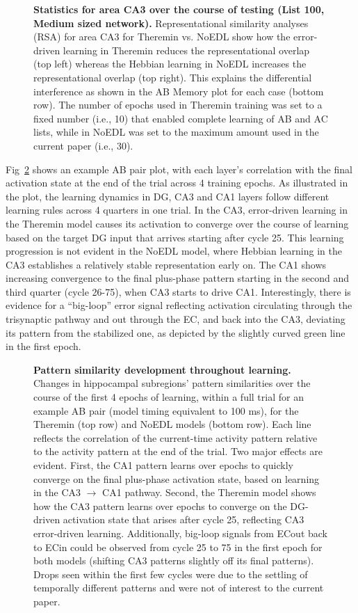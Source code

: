 \documentclass[10pt,letterpaper]{article}
\begin{document}
\begin{figure}[!h]
  \caption{{\bf Statistics for area CA3 over the course of testing (List 100, Medium sized network).}
  Representational similarity analyses (RSA) for area CA3 for Theremin vs. NoEDL show how the error-driven learning in Theremin reduces the representational overlap (top left) whereas the Hebbian learning in NoEDL increases the representational overlap (top right).  This explains the differential interference as shown in the AB Memory plot for each case (bottom row). The number of epochs used in Theremin training was set to a fixed number (i.e., 10) that enabled complete learning of AB and AC lists, while in NoEDL was set to the maximum amount used in the current paper (i.e., 30).}
\label{fig5}
\end{figure}

Fig~\ref{fig6} shows an example AB pair plot, with each layer's correlation with the final activation state at the end of the trial across 4 training epochs.  As illustrated in the plot, the learning dynamics in DG, CA3 and CA1 layers follow different learning rules across 4 quarters in one trial.  In the CA3, error-driven learning in the Theremin model causes its activation to converge over the course of learning based on the target DG input that arrives starting after cycle 25.  This learning progression is not evident in the NoEDL model, where Hebbian learning in the CA3 establishes a relatively stable representation early on.  The CA1 shows increasing convergence to the final plus-phase pattern starting in the second and third quarter (cycle 26-75), when CA3 starts to drive CA1.  Interestingly, there is evidence for a ``big-loop'' error signal \cite{KumaranMcClelland12} reflecting activation circulating through the trisynaptic pathway and out through the EC, and back into the  CA3, deviating its pattern from the stabilized one, as depicted by the slightly curved green line in the first epoch.

\begin{figure}[!h]
  \caption{{\bf Pattern similarity development throughout learning.}
  Changes in hippocampal subregions' pattern similarities over the course of the first 4 epochs of learning, within a full trial for an example AB pair (model timing equivalent to 100 ms), for the Theremin (top row) and NoEDL models (bottom row).  Each line reflects the correlation of the current-time activity pattern relative to the activity pattern at the end of the trial.  Two major effects are evident.  First, the CA1 pattern learns over epochs to quickly converge on the final plus-phase activation state, based on learning in the CA3 $\rightarrow$ CA1 pathway.  Second, the Theremin model shows how the CA3 pattern learns over epochs to converge on the DG-driven activation state that arises after cycle 25, reflecting CA3 error-driven learning.  Additionally, big-loop signals from ECout back to ECin could be observed from cycle 25 to 75 in the first epoch for both models (shifting CA3 patterns slightly off its final patterns).  Drops seen within the first few cycles were due to the settling of temporally different patterns and were not of interest to the current paper.}
\label{fig6}
\end{figure}
\end{document}

